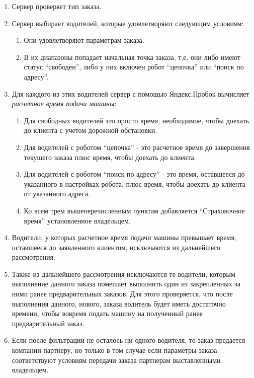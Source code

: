			\begin{enumerate}
				\item{Сервер проверяет тип заказа.}

				\item{Сервер выбирает водителей, которые удовлетворяют следующим условиям: \begin{enumerate}[label*=\arabic*.] \item{Они удовлетворяют параметрам заказа.} \item{В их диапазоны попадает начальная точка заказа, т.е. они либо имеют статус “свободен”, либо у них включен робот “цепочка” или “поиск по адресу”.} \end{enumerate}}

				\item{Для каждого из этих водителей сервер с помощью Яндекс.Пробок вычисляет \textit{расчетное время подачи машины}: \begin{enumerate}[label*=\arabic*.] \item{Для свободных водителей это просто время, необходимое, чтобы доехать до клиента с учетом дорожной обстановки.} \item{Для водителей с роботом “цепочка” - это расчетное время до завершения текущего заказа плюс время, чтобы доехать до клиента.} \item{Для водителей с роботом “поиск по адресу” - это время, оставшееся до указанного в настройках робота, плюс время, чтобы доехать до клиента от указанного адреса.} \item{Ко всем трем вышеперечисленным пунктам добавляется “Страховочное время” установленное владельцем.} \end{enumerate}}

				\item{Водители, у которых расчетное время подачи машины превышает время, оставшееся до заявленного клиентом, исключаются из дальнейшего рассмотрения.}

				\item{Также из дальнейшего рассмотрения исключаются те водители, которым выполнение данного заказа помешает выполнить один из закрепленных за ними ранее предварительных заказов. Для этого проверяется, что после выполнения данного, нового, заказа водитель будет иметь достаточно времени, чтобы вовремя подать машину на полученный ранее предварительный заказ.}

				\item{Если после фильтрации не осталось ни одного водителя, то заказ предается компании-партнеру, но только в том случае если параметры заказа соответствуют условиям передачи заказа партнерам выставленными владельцем.}
			\end{enumerate}

